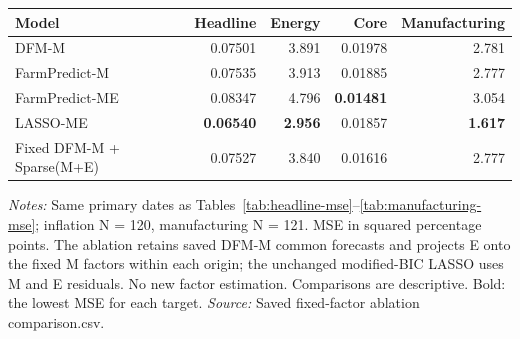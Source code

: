 \begin{threeparttable}
\begin{tabular}{lrrrr}
\toprule
Model & Headline & Energy & Core & Manufacturing \\
\midrule
DFM-M & 0.07501 & 3.891 & 0.01978 & 2.781 \\
FarmPredict-M & 0.07535 & 3.913 & 0.01885 & 2.777 \\
FarmPredict-ME & 0.08347 & 4.796 & \textbf{0.01481} & 3.054 \\
LASSO-ME & \textbf{0.06540} & \textbf{2.956} & 0.01857 & \textbf{1.617} \\
Fixed DFM-M + Sparse(M+E) & 0.07527 & 3.840 & 0.01616 & 2.777 \\
\bottomrule
\end{tabular}
\begin{tablenotes}[flushleft]\footnotesize
\item \textit{Notes:} Same primary dates as Tables~\ref{tab:headline-mse}--\ref{tab:manufacturing-mse}; inflation N = 120, manufacturing N = 121. MSE in squared percentage points. The ablation retains saved DFM-M common forecasts and projects E onto the fixed M factors within each origin; the unchanged modified-BIC LASSO uses M and E residuals. No new factor estimation. Comparisons are descriptive. Bold: the lowest MSE for each target. \textit{Source:} Saved fixed-factor ablation comparison.csv.
\end{tablenotes}
\end{threeparttable}
